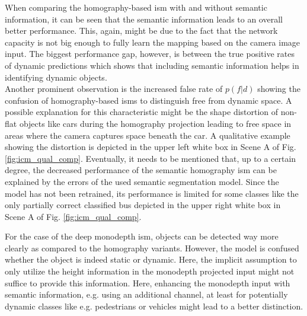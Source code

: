 When comparing the homography-based \gls{ism} with and without semantic information, it can be seen that the semantic information leads to an overall better performance. This, again, might be due to the fact that the network capacity is not big enough to fully learn the mapping based on the camera image input. The biggest performance gap, however, is between the true positive rates of dynamic predictions which shows that including semantic information helps in identifying dynamic objects. \\
Another prominent observation is the increased false rate of $p(f|d)$ showing the confusion of homography-based \gls{ism}s to distinguish free from dynamic space. A possible explanation for this characteristic might be the shape distortion of non-flat objects like cars during the homography projection leading to free space in areas where the camera captures space beneath the car. A qualitative example showing the distortion is depicted in the upper left white box in Scene A of Fig. \ref{fig:icm_qual_comp}. Eventually, it needs to be mentioned that, up to a certain degree, the decreased performance of the semantic homography \gls{ism} can be explained by the errors of the used semantic segmentation model. Since the model has not been retrained, its performance is limited for some classes like the only partially correct classified bus depicted in the upper right white box in Scene A of Fig. \ref{fig:icm_qual_comp}.

For the case of the deep \gls{monodepth} \gls{ism}, objects can be detected way more clearly as compared to the homography variants. However, the model is confused whether the object is indeed static or dynamic. Here, the implicit assumption to only utilize the height information in the \gls{monodepth} projected input might not suffice to provide this information. Here, enhancing the \gls{monodepth} input with semantic information, e.g. using an additional channel, at least for potentially dynamic classes like e.g. pedestrians or vehicles might lead to a better distinction.\\

